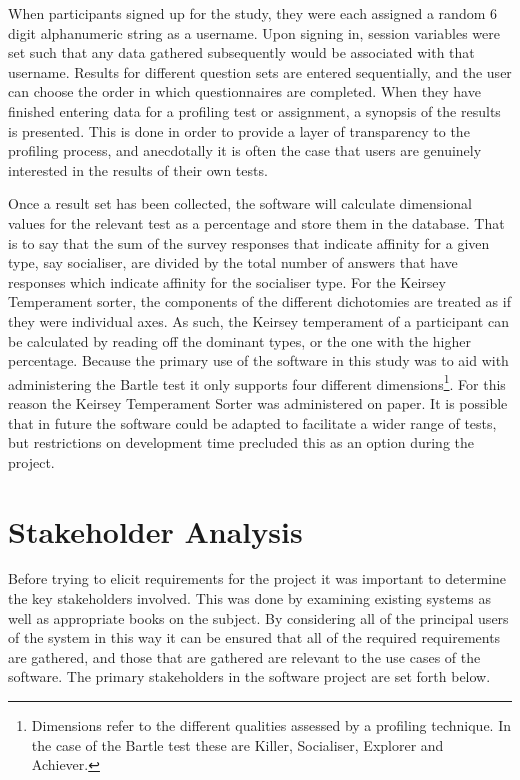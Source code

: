 \documentclass[12pt,a4paper,twoside]{report}
\begin{document}
When participants signed up for the study, they were each assigned a random 6 digit alphanumeric string as a username. Upon signing in, session variables were set such that any data gathered subsequently would be associated with that username. Results for different question sets are entered sequentially, and the user can choose the order in which questionnaires are completed. When they have finished entering data for a profiling test or assignment, a synopsis of the results is presented. This is done in order to provide a layer of transparency to the profiling process, and anecdotally it is often the case that users are genuinely interested in the results of their own tests.

Once a result set has been collected, the software will calculate dimensional values for the relevant test as a percentage and store them in the database. That is to say that the sum of the survey responses that indicate affinity for a given type, say socialiser, are divided by the total number of answers that have responses which indicate affinity for the socialiser type. For the Keirsey Temperament sorter, the components of the different dichotomies are treated as if they were individual axes. As such, the Keirsey temperament of a participant can be calculated by reading off the dominant types, or the one with the higher percentage. Because the primary use of the software in this study was to aid with administering the Bartle test it only supports four different dimensions\footnote{Dimensions refer to the different qualities assessed by a profiling technique. In the case of the Bartle test these are Killer, Socialiser, Explorer and Achiever.}. For this reason the Keirsey Temperament Sorter was administered on paper. It is possible that in future the software could be adapted to facilitate a wider range of tests, but restrictions on development time precluded this as an option during the project.

\section{Stakeholder Analysis}
Before trying to elicit requirements for the project it was important to determine the key stakeholders involved. This was done by examining existing systems as well as appropriate books on the subject. By considering all of the principal users of the system in this way it can be ensured that all of the required requirements are gathered, and those that are gathered are relevant to the use cases of the software. The primary stakeholders in the software project are set forth below.
\end{document}
